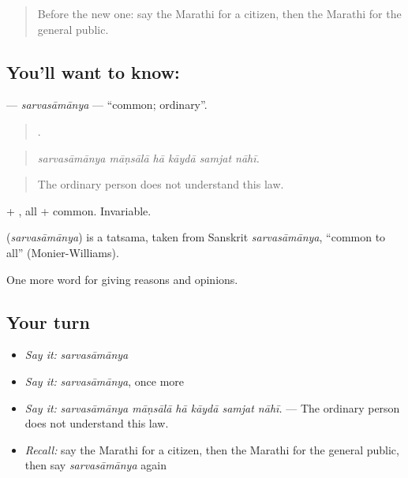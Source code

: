 \label{lesson:MR-C354-sarvasamanya}



\begin{quote}
Before the new one: say the Marathi for a citizen, then the Marathi for the general public.
\end{quote}

\subsection*{You'll want to know: }
\textbf{} — \emph{sarvasāmānya} — \textquotedblleft{}common; ordinary\textquotedblright{}.

\begin{quote}
     .
\end{quote}

\begin{quote}
\emph{sarvasāmānya māṇsālā hā kāydā samjat nāhī.}
\end{quote}

\begin{quote}
The ordinary person does not understand this law.
\end{quote}

 + , all + common. Invariable.

\begin{cousinweb}
\textbf{} (\emph{sarvasāmānya}) is a tatsama, taken from Sanskrit \emph{sarvasāmānya}, \textquotedblleft{}common to all\textquotedblright{} (Monier-Williams).
\end{cousinweb}

\begin{grammarlens}[title={What you've built}]
One more word for giving reasons and opinions.
\end{grammarlens}

\subsection*{Your turn}
\begin{itemize}
\raggedright
  \item \emph{Say it:} \emph{sarvasāmānya}
  \item \emph{Say it:} \emph{sarvasāmānya}, once more
  \item \emph{Say it:} \emph{sarvasāmānya māṇsālā hā kāydā samjat nāhī.} — The ordinary person does not understand this law.
  \item \emph{Recall:} say the Marathi for a citizen, then the Marathi for the general public, then say \emph{sarvasāmānya} again
\end{itemize}

